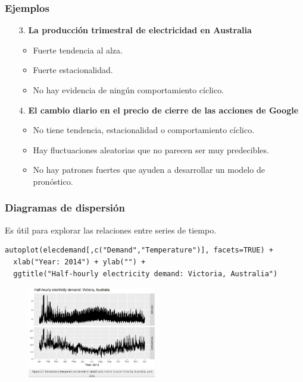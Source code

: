 \documentclass[10pt]{beamer}
\begin{document}
\begin{frame}[fragile]
\frametitle{Ejemplos}

\begin{enumerate}
\item[3.] \textbf{La producción trimestral de electricidad en Australia}

\begin{itemize}
\item Fuerte tendencia al alza. 
\item Fuerte estacionalidad. 
\item No hay evidencia de ningún comportamiento cíclico.
\end{itemize}

\pause
\vspace{3mm}

\item[4.] \textbf{El cambio diario en el precio de cierre de las acciones de Google} 

\begin{itemize}
\item No tiene tendencia, estacionalidad o comportamiento cíclico. 
\item Hay fluctuaciones aleatorias que no parecen ser muy predecibles.
\item No hay patrones fuertes que ayuden a desarrollar un modelo de pronóstico.
\end{itemize}


\end{enumerate}


\end{frame}





\begin{frame}[fragile]
\frametitle{Diagramas de dispersión}

Es útil para explorar las relaciones entre series de tiempo.


\lstset{language=r,label= ,caption= ,captionpos=b,numbers=none}
\begin{lstlisting}
autoplot(elecdemand[,c("Demand","Temperature")], facets=TRUE) +
  xlab("Year: 2014") + ylab("") +
  ggtitle("Half-hourly electricity demand: Victoria, Australia")
\end{lstlisting}

\pause

\begin{figure}
\begin{center}
    \includegraphics[width=0.5\textwidth]{Imagen22.JPG}
\end{center}
\end{figure}

\end{frame}
\end{document}
